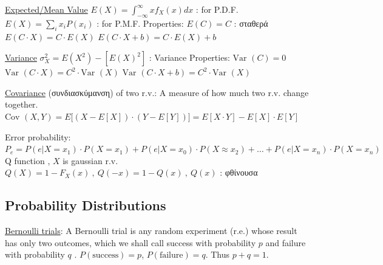 \documentclass[12pt]{article}
\def\Var{\text{Var\ }} %
\def\Cov{\text{Cov\ }} %
\begin{document}
\begin{flushleft}
	\uline{Expected/Mean Value} \linebreak 
	\textbullet \quad $E(X) = \int_{-\infty}^{\infty} x f_X (x) dx $  :  for P.D.F. \linebreak 
	\textbullet \quad $E(X) = \sum \limits_i x_i P(x_i) $  :  for P.M.F. \linebreak 
	Properties: \linebreak 
	\textbullet \quad $E(C) = C$  :  \textgreek{σταθερά} \linebreak 
	\textbullet \quad $E(C\cdot X) = C \cdot E(X) $ \linebreak 
	\textbullet \quad $E(C\cdot X + b) = C \cdot E(X) + b$ \linebreak 
	
	\uline{Variance} \linebreak 
	\textbullet \quad $\sigma_X^2 = E(X^2) - \left[ E(X)^2 \right] $  :  Variance \linebreak 
	Properties: \linebreak 
	\textbullet \quad $\Var(C) = 0 $ \linebreak 
	\textbullet \quad $\Var(C\cdot X) = C^2 \cdot \Var(X) $ \linebreak 
	\textbullet \quad $\Var(C\cdot X + b) = C^2 \cdot \Var(X) $ \linebreak 
	
	\textbullet \quad \uline{Covariance} (\textgreek{συνδιασκύμανση}) of two r.v.: A measure of how much two r.v. change together. \linebreak 
	$\displaystyle \Cov(X,Y) = E\big[(X-E[X]) \cdot (Y-E[Y]) \big] = E[X\cdot Y] - E[X] \cdot E[Y] $ \linebreak 
	
	\textbullet \quad Error probability: $P_e = P(e | X=x_1) \cdot P(X= x_1) + P(e|X=x_0) \cdot P(X \approx x_2) + \ldots + P(e|X = x_n) \cdot P(X=x_n) $ \linebreak 
	\textbullet \quad Q function , $X$ is gaussian r.v. \linebreak 
	\textbullet \quad $Q(X) = 1 - F_X(x) \ , \ Q(-x) = 1 - Q(x) \ , \ Q(x) $  :  \textgreek{φθίνουσα} \linebreak 

	\subsection{Probability Distributions}
	
	\uline{Bernoulli trials}: A Bernoulli trial is any random experiment (r.e.) whose result has only two outcomes, which we shall call success with probability $p$ and failure with probability $q$ . $P(\text{success}) = p$, $P(\text{failure}) = q$. Thus $p+q=1$. \linebreak 
	

\end{flushleft}
\end{document}
